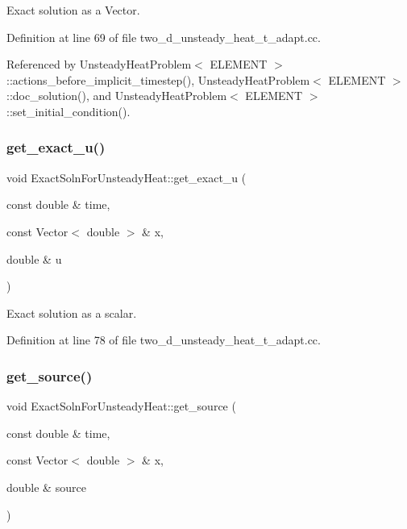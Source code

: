 Exact solution as a Vector. 



Definition at line 69 of file two\+\_\+d\+\_\+unsteady\+\_\+heat\+\_\+t\+\_\+adapt.\+cc.



Referenced by Unsteady\+Heat\+Problem$<$ E\+L\+E\+M\+E\+N\+T $>$\+::actions\+\_\+before\+\_\+implicit\+\_\+timestep(), Unsteady\+Heat\+Problem$<$ E\+L\+E\+M\+E\+N\+T $>$\+::doc\+\_\+solution(), and Unsteady\+Heat\+Problem$<$ E\+L\+E\+M\+E\+N\+T $>$\+::set\+\_\+initial\+\_\+condition().

\mbox{\label{namespaceExactSolnForUnsteadyHeat_a36e38a9c0c7c0bf8916e2d86ac75b4e2}} 
\subsubsection{\texorpdfstring{get\+\_\+exact\+\_\+u()}{get\_exact\_u()}\hspace{0.1cm}{\footnotesize\ttfamily [2/2]}}
{\footnotesize\ttfamily void Exact\+Soln\+For\+Unsteady\+Heat\+::get\+\_\+exact\+\_\+u (\begin{DoxyParamCaption}\item[{const double \&}]{time,  }\item[{const Vector$<$ double $>$ \&}]{x,  }\item[{double \&}]{u }\end{DoxyParamCaption})}



Exact solution as a scalar. 



Definition at line 78 of file two\+\_\+d\+\_\+unsteady\+\_\+heat\+\_\+t\+\_\+adapt.\+cc.

\mbox{\label{namespaceExactSolnForUnsteadyHeat_ab4e853d6368b1fcdbd6205079687455a}} 
\subsubsection{\texorpdfstring{get\+\_\+source()}{get\_source()}}
{\footnotesize\ttfamily void Exact\+Soln\+For\+Unsteady\+Heat\+::get\+\_\+source (\begin{DoxyParamCaption}\item[{const double \&}]{time,  }\item[{const Vector$<$ double $>$ \&}]{x,  }\item[{double \&}]{source }\end{DoxyParamCaption})}



